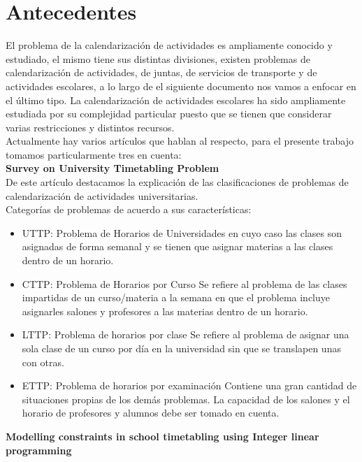 \label{sec:introduccion}

\section{Antecedentes}
	El problema de la calendarización de actividades es ampliamente conocido y estudiado, el mismo tiene sus distintas divisiones, existen problemas de calendarización de actividades, de juntas, de servicios de transporte y de actividades escolares, a lo largo de el siguiente documento nos vamos a enfocar en el último tipo. La calendarización de actividades escolares ha sido ampliamente estudiada por su complejidad particular puesto que se tienen que considerar varias restricciones y distintos recursos.\\
	
	Actualmente hay varios artículos que hablan al respecto, para el presente trabajo tomamos particularmente tres en cuenta:\\
	
	\textbf{Survey on University Timetabling Problem} \\
	
	De este artículo destacamos la explicación de las clasificaciones de problemas de calendarización de actividades universitarias. \\
	
	Categorías de problemas de acuerdo a sus características:
		
		\begin{itemize}
			\item UTTP: Problema de Horarios de Universidades
			en cuyo caso las clases son asignadas de forma semanal y se tienen que asignar materias a las clases dentro de un horario.
			
			\item CTTP: Problema de Horarios por Curso
			Se refiere al problema de las clases impartidas de un curso/materia a la semana en que el problema incluye asignarles salones y profesores a las materias dentro de un horario.
			
			\item LTTP: Problema de horarios por clase
			Se refiere al problema de asignar una sola clase de un curso por día en la universidad sin que se translapen unas con otras.
			
			\item ETTP: Problema de horarios por examinación
			Contiene una gran cantidad de situaciones propias de los demás problemas. La capacidad de los salones y el horario de profesores y alumnos debe ser tomado en cuenta.
			
		\end{itemize}
	\textbf{Modelling constraints in school timetabling using Integer linear programming} \\
	
